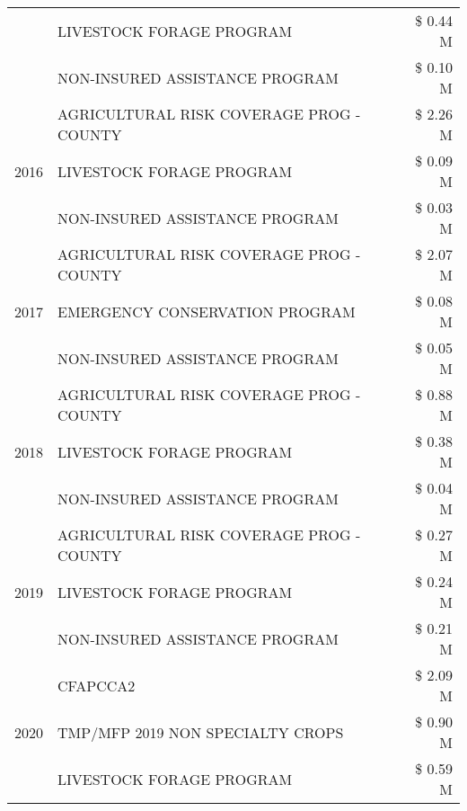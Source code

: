 \begin{tabular}{llr}
 & LIVESTOCK FORAGE PROGRAM & \$ 0.44 M \\
 & NON-INSURED ASSISTANCE PROGRAM & \$ 0.10 M \\
\cline{1-3}
\multirow[t]{3}{*}{2016} & AGRICULTURAL RISK COVERAGE PROG - COUNTY & \$ 2.26 M \\
 & LIVESTOCK FORAGE PROGRAM & \$ 0.09 M \\
 & NON-INSURED ASSISTANCE PROGRAM & \$ 0.03 M \\
\cline{1-3}
\multirow[t]{3}{*}{2017} & AGRICULTURAL RISK COVERAGE PROG - COUNTY & \$ 2.07 M \\
 & EMERGENCY CONSERVATION PROGRAM & \$ 0.08 M \\
 & NON-INSURED ASSISTANCE PROGRAM & \$ 0.05 M \\
\cline{1-3}
\multirow[t]{3}{*}{2018} & AGRICULTURAL RISK COVERAGE PROG - COUNTY & \$ 0.88 M \\
 & LIVESTOCK FORAGE PROGRAM & \$ 0.38 M \\
 & NON-INSURED ASSISTANCE PROGRAM & \$ 0.04 M \\
\cline{1-3}
\multirow[t]{3}{*}{2019} & AGRICULTURAL RISK COVERAGE PROG - COUNTY & \$ 0.27 M \\
 & LIVESTOCK FORAGE PROGRAM & \$ 0.24 M \\
 & NON-INSURED ASSISTANCE PROGRAM & \$ 0.21 M \\
\cline{1-3}
\multirow[t]{3}{*}{2020} & CFAPCCA2 & \$ 2.09 M \\
 & TMP/MFP 2019 NON SPECIALTY CROPS & \$ 0.90 M \\
 & LIVESTOCK FORAGE PROGRAM & \$ 0.59 M \\
\cline{1-3}
\bottomrule
\end{tabular}
